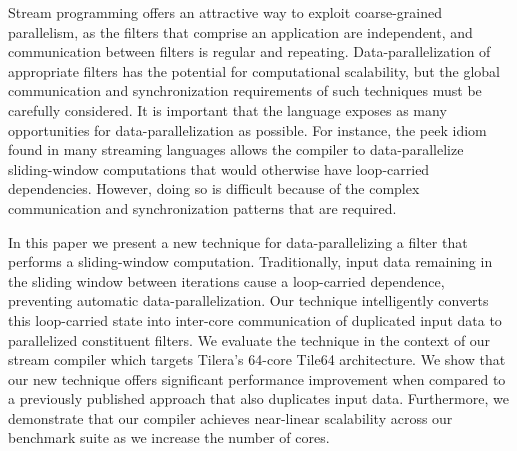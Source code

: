 Stream programming offers an attractive way to exploit coarse-grained
parallelism, as the filters that comprise an application are
independent, and communication between filters is regular and
repeating. Data-parallelization of appropriate filters has the
potential for computational scalability, but the global communication
and synchronization requirements of such techniques must be carefully
considered.  It is important that the language exposes as many
opportunities for data-parallelization as possible. For instance, the
peek idiom found in many streaming languages allows the compiler to
data-parallelize sliding-window computations that would otherwise have
loop-carried dependencies.  However, doing so is difficult because of
the complex communication and synchronization patterns that are
required.

In this paper we present a new technique for data-parallelizing a
filter that performs a sliding-window computation. Traditionally,
input data remaining in the sliding window between iterations cause a
loop-carried dependence, preventing automatic
data-parallelization. Our technique intelligently converts this
loop-carried state into inter-core communication of duplicated input
data to parallelized constituent filters.  We evaluate the technique
in the context of our stream compiler which targets Tilera's 64-core
Tile64 architecture.  We show that our new technique offers
significant performance improvement when compared to a previously
published approach that also duplicates input data.  Furthermore, we
demonstrate that our compiler achieves near-linear scalability across
our benchmark suite as we increase the number of cores.


